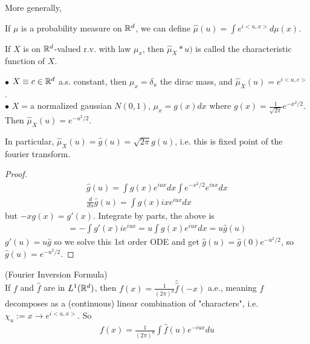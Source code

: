 \documentclass[a4paper]{article}
\begin{document}
More generally,
\begin{defi}
If $\mu$ is a probability measure on $\mathbb{R}^d$, we can define $\hat{\mu}(u) = \int e^{i<u,x>} d\mu(x)$.
\end{defi}

\begin{eg}
If $X$ is on $\mathbb{R}^d$-valued r.v. with law $\mu_x$, then $\hat{\mu}_X*u)$ is called the characteristic function of $X$.
\end{eg}

\begin{eg}
$\bullet$ $X \equiv c \in \mathbb{R}^d$ a.s. constant, then $\mu_x = \delta_u$ the dirac mass, and $\hat{\mu}_X (u) = e^{i<u,c>}$.\\
$\bullet$ $X = $a normalized gaussian $N(0,1)$, $\mu_x = g(x) dx$ where $g(x) = \frac{1}{\sqrt{2\pi}} e^{-x^2/2}$. Then $\hat{\mu}_X(u) = e^{-u^2/2}$.

In particular, $\hat{\mu}_X(u) = \hat{g}(u) = \sqrt{2\pi}g(u)$, i.e. this is fixed point of the fourier transform.
\begin{proof}
\begin{equation*}
\begin{aligned}
\hat{g}(u) = \int g(x) e^{iux} dx \int e^{-x^2/2} e^{iux} dx\\
\frac{d}{du} \hat{g}(u) = \int g(x) ix e^{iux} dx
\end{aligned}
\end{equation*}
but $-xg(x) = g'(x)$. Integrate by parts, the above is
\begin{equation*}
\begin{aligned}
=-\int g'(x)ie^{iux} = u\int g(x) e^{iux}dx = u\hat{g}(u)
\end{aligned}
\end{equation*}
$g'(u) = u\hat{g}$ so we solve this 1st order ODE and get $\hat{g}(u) = \hat{g}(0) e^{-u^2/2}$, so $\hat{g}(u) = e^{-u^2/2}$.
\end{proof}
\end{eg}

\begin{thm} (Fourier Inversion Formula)\\
If $f$ and $\hat{f}$ are in $L^1 (\mathbb{R}^d)$, then $f(x) = \frac{1}{(2\pi)^d} \hat{\hat{f}} (-x)$ a.e., meaning $f$ decomposes as a (continuous) linear combination of "characters", i.e. $\chi_u := x \to e^{i<u,x>}$. So
\begin{equation*}
\begin{aligned}
f(x) = \frac{1}{(2\pi)^d} \int \hat{f}(u) e^{-iux} du
\end{aligned}
\end{equation*}
\end{thm}
\end{document}
